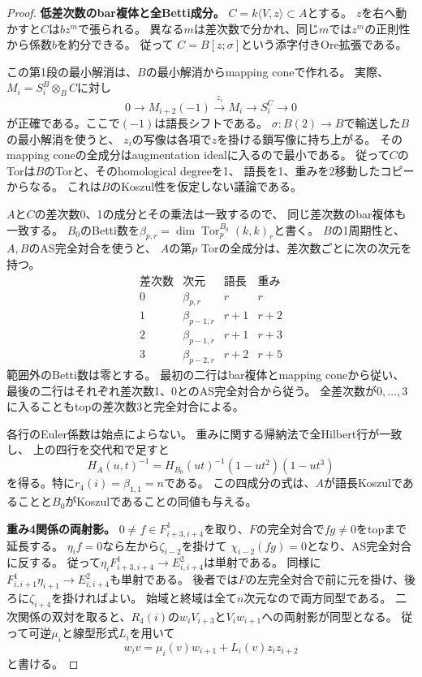 \documentclass[11pt,a4paper]{ltjsarticle}
\theoremstyle{definition}
\begin{document}
\begin{proof}
\par\smallskip\noindent\textbf{低差次数のbar複体と全Betti成分。}\quad
$C=k\langle V,z\rangle\subset A$とする。
$z$を右へ動かすと$C$は$bz^m$で張られる。
異なる$m$は差次数で分かれ、同じ$m$では$z^m$の正則性から係数$b$を約分できる。
従って
$C=B[z;\sigma]$という添字付きOre拡張である。

この第1段の最小解消は、$B$の最小解消からmapping coneで作れる。
実際、$M_i=S_i^B\otimes_B C$に対し
\[
0\longrightarrow M_{i+2}(-1)
\xrightarrow{z_i}M_i\longrightarrow S_i^C\longrightarrow0
\]
が正確である。ここで$(-1)$は語長シフトである。
$\sigma:B(2)\to B$で輸送した$B$の最小解消を使うと、
$z_i$の写像は各項で$z$を掛ける鎖写像に持ち上がる。
そのmapping coneの全成分はaugmentation idealに入るので最小である。
従って$C$のTorは$B$のTorと、そのhomological degreeを1、
語長を1、重みを2移動したコピーからなる。
これは$B$のKoszul性を仮定しない議論である。

$A$と$C$の差次数0、1の成分とその乗法は一致するので、
同じ差次数のbar複体も一致する。
$B_0$のBetti数を$\beta_{p,r}=\dim\operatorname{Tor}^{B_0}_p(k,k)_r$と書く。
$B$の1周期性と、$A,B$のAS完全対合を使うと、
$A$の第$p$ Torの全成分は、差次数ごとに次の次元を持つ。
\[
\begin{array}{c|c|c|c}
\text{差次数}&\text{次元}&\text{語長}&\text{重み}\\ \hline
0&\beta_{p,r}&r&r\\
1&\beta_{p-1,r}&r+1&r+2\\
2&\beta_{p-1,r}&r+1&r+3\\
3&\beta_{p-2,r}&r+2&r+5
\end{array}
\]
範囲外のBetti数は零とする。
最初の二行はbar複体とmapping coneから従い、
最後の二行はそれぞれ差次数1、0とのAS完全対合から従う。
全差次数が$0,\ldots,3$に入ることもtopの差次数3と完全対合による。

各行のEuler係数は始点によらない。
重みに関する帰納法で全Hilbert行が一致し、
上の四行を交代和で足すと
\[
H_A(u,t)^{-1}
=H_{B_0}(ut)^{-1}(1-ut^2)(1-ut^3)
\]
を得る。特に$r_4(i)=\beta_{1,1}=n$である。
この四成分の式は、$A$が語長Koszulであることと$B_0$がKoszulであることの同値も与える。

\par\smallskip\noindent\textbf{重み4関係の両射影。}\quad
$0\ne f\in F^1_{i+3,i+4}$を取り、$F$の完全対合で$fg\ne0$をtopまで延長する。
$\eta_i f=0$なら左から$\zeta_{i-2}$を掛けて
$\chi_{i-2}(fg)=0$となり、AS完全対合に反する。
従って$\eta_iF^1_{i+3,i+4}\to E^2_{i,i+4}$は単射である。
同様に$F^1_{i,i+1}\eta_{i+1}\to E^2_{i,i+4}$も単射である。
後者では$F$の左完全対合で前に元を掛け、後ろに$\zeta_{i+4}$を掛ければよい。
始域と終域は全て$n$次元なので両方同型である。
二次関係の双対を取ると、$R_4(i)$の$w_iV_{i+3}$と$V_iw_{i+1}$への両射影が同型となる。
従って可逆$\mu_i$と線型形式$L_i$を用いて
\[
w_i v=\mu_i(v)w_{i+1}+L_i(v)z_i z_{i+2}
\]
と書ける。


\end{proof}
\end{document}
